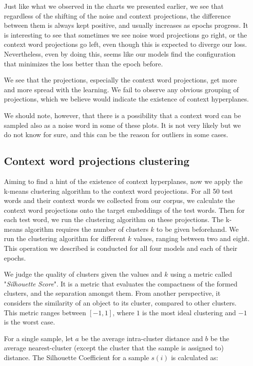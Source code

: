 Just like what we observed in the charts we presented earlier, we see that regardless of the shifting of the noise and context projections, the difference between them is always kept positive, and usually increases as epochs progress. It is interesting to see that sometimes we see noise word projections go right, or the context word projections go left, even though this is expected to diverge our loss. Nevertheless, even by doing this, seems like our models find the configuration that minimizes the loss better than the epoch before.

We see that the projections, especially the context word projections, get more and more spread with the learning. We fail to observe any obvious grouping of projections, which we believe would indicate the existence of context hyperplanes. 

We should note, however, that there is a possibility that a context word can be sampled also as a noise word in some of these plots. It is not very likely but we do not know for sure, and this can be the reason for outliers in some cases.

\subsection{Context word projections clustering}

Aiming to find a hint of the existence of context hyperplanes, now we apply the k-means clustering algorithm to the context word projections. For all 50 test words and their context words we collected from our corpus, we calculate the context word projections onto the target embeddings of the test words. Then for each test word, we run the clustering algorithm on these projections. The k-means algorithm requires the number of clusters $k$ to be given beforehand. We run the clustering algorithm for different $k$ values, ranging between two and eight. This operation we described is conducted for all four models and each of their epochs.

We judge the quality of clusters given the values and $k$ using a metric called "\textit{Silhouette Score}". It is a metric that evaluates the compactness of the formed clusters, and the separation amongst them. From another perspective, it considers the similarity of an object to its cluster, compared to other clusters. This metric ranges between $[-1, 1]$, where $1$ is the most ideal clustering and $-1$ is the worst case.

For a single sample, let $a$ be the average intra-cluster distance and $b$ be the average nearest-cluster (except the cluster that the sample is assigned to) distance. The Silhouette Coefficient for a sample $s(i)$ is calculated as:

